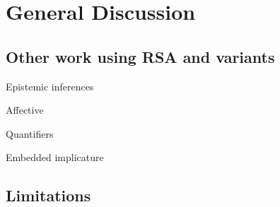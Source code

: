 \section{General Discussion}
\label{sec:discussion}


\subsection{Other work using RSA and variants}

Epistemic inferences \cite{goodman2013}

Affective \cite{kao2014}


Quantifiers \cite{franke2013}


Embedded implicature \cite{pottsunderreview}

\subsection{Limitations}


